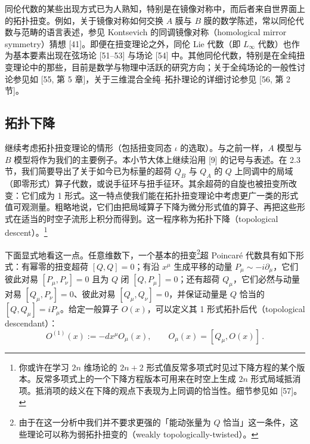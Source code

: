 同伦代数的某些出现方式已为人熟知，特别是在镜像对称中，而后者来自世界面上的拓扑扭变。例如，关于镜像对称如何交换 $A$ 膜与 $B$ 膜的数学陈述，常以同伦代数与范畴的语言表述，参见 Kontsevich 的同调镜像对称（homological mirror symmetry）猜想 [41]。即便在扭变理论之外，同伦 Lie 代数（即 $L_\infty$ 代数）也作为基本要素出现在弦场论 [51–53] 与场论 [54] 中。其他同伦代数，特别是在全纯扭变理论中的那些，目前是数学与物理中活跃的研究方向；关于全纯场论的一般性讨论参见如 [55, 第 5 章]，关于三维混合全纯–拓扑理论的详细讨论参见 [56, 第 2 节]。

\subsection{拓扑下降}

继续考虑拓扑扭变理论的情形（包括扭变同态 $\iota$ 的选取）。与之前一样，$A$ 模型与 $B$ 模型将作为我们的主要例子。本小节大体上继续沿用 [9] 的记号与表述。在 2.3 节，我们简要导出了关于如今已为标量的超荷 $Q_B$ 与 $Q_A$ 的 $Q$ 上同调中的局域（即零形式）算子代数，或说手征环与扭手征环。其余超荷的自旋也被扭变所改变：它们成为 1 形式。这一特点使我们能在拓扑扭变理论中考虑更广一类的形式值可观测量。粗略地说，它们由把局域算子下降为微分形式值的算子、再把这些形式在适当的时空子流形上积分而得到。这一程序称为拓扑下降（topological descent）。\footnote{你或许在学习 $2n$ 维场论的 $2n+2$ 形式值反常多项式时见过下降方程的某个版本。反常多项式上的一个下降方程版本可用来在时空上生成 $2n$ 形式局域抵消项。抵消项的歧义在下降的观点下表现为上同调的恰当性。细节参见如 [57]。}

下面显式地看这一点。任意维数下，一个基本的扭变\footnote{由于在这一分析中我们并不要求更强的「能动张量为 $Q$ 恰当」这一条件，这些理论可以称为弱拓扑扭变的（weakly topologically-twisted）。}超 Poincaré 代数具有如下形式：有幂零的扭变超荷 $[Q,Q]=0$；有沿 $x^\mu$ 生成平移的动量 $P_\mu \sim -i\partial_\mu$，它们彼此对易 $[P_\mu,P_\nu]=0$ 且为 $Q$ 闭 $[Q,P_\mu]=0$；还有超荷 $Q_\mu$，它们必然与动量对易 $[Q_\mu,P_\nu]=0$、彼此对易 $[Q_\mu,Q_\nu]=0$，并保证动量是 $Q$ 恰当的 $[Q,Q_\mu]=iP_\mu$。给定一般算子 $O(x)$，可以定义其 1 形式拓扑后代（topological descendant）：
\begin{equation}\tag{3.1}
O^{(1)}(x) := -dx^\mu O_\mu(x),\qquad O_\mu(x) = [Q_\mu,O(x)]\,.
\end{equation}

